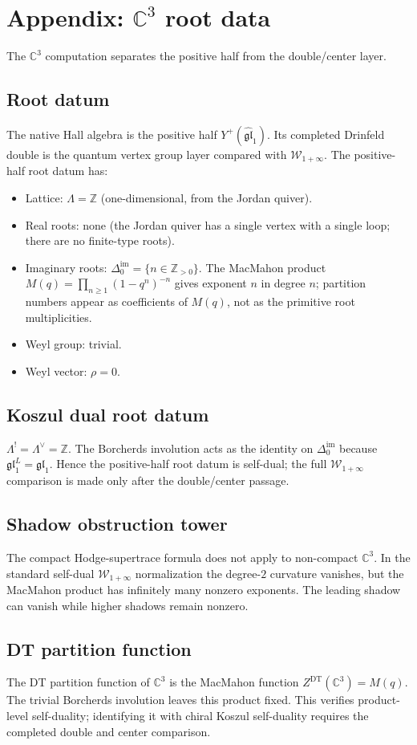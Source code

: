 \documentclass[11pt]{article}
\theoremstyle{definition}
\theoremstyle{remark}
\DeclareMathOperator{\DT}{DT}
\newcommand{\bC}{\mathbb{C}}
\newcommand{\bZ}{\mathbb{Z}}
\begin{document}
\section{Appendix: $\bC^3$ root data}
\label{sec:appendix-c3}

The $\bC^3$ computation separates the positive half from the
double/center layer.

\subsection{Root datum}
The native Hall algebra is the positive half
$Y^+(\widehat{\mathfrak{gl}}_1)$. Its completed Drinfeld double is the
quantum vertex group layer compared with $\mathcal W_{1+\infty}$. The
positive-half root datum has:
\begin{itemize}
\item Lattice: $\Lambda = \bZ$ (one-dimensional, from the Jordan quiver).
\item Real roots: none (the Jordan quiver has a single vertex with a
single loop; there are no finite-type roots).
\item Imaginary roots: $\Delta^{\mathrm{im}}_0 = \{n \in \bZ_{>0}\}$.
The MacMahon product
$M(q)=\prod_{n\geq 1}(1-q^n)^{-n}$ gives exponent $n$ in degree $n$;
partition numbers appear as coefficients of $M(q)$, not as the
primitive root multiplicities.
\item Weyl group: trivial.
\item Weyl vector: $\rho = 0$.
\end{itemize}

\subsection{Koszul dual root datum}
$\Lambda^! = \Lambda^\vee = \bZ$. The Borcherds involution acts as the
identity on $\Delta^{\mathrm{im}}_0$ because
$\mathfrak{gl}_1^L=\mathfrak{gl}_1$. Hence the positive-half root datum
is self-dual; the full $\mathcal W_{1+\infty}$ comparison is made only
after the double/center passage.

\subsection{Shadow obstruction tower}
The compact Hodge-supertrace formula does not apply to non-compact
$\bC^3$. In the standard self-dual $\mathcal W_{1+\infty}$ normalization
the degree-$2$ curvature vanishes, but the MacMahon product has
infinitely many nonzero exponents. The leading shadow can vanish while
higher shadows remain nonzero.

\subsection{DT partition function}
The DT partition function of $\bC^3$ is the MacMahon function
$Z^{\DT}(\bC^3)=M(q)$. The trivial Borcherds involution leaves this
product fixed. This verifies product-level self-duality; identifying it
with chiral Koszul self-duality requires the completed double and
center comparison.
\end{document}
